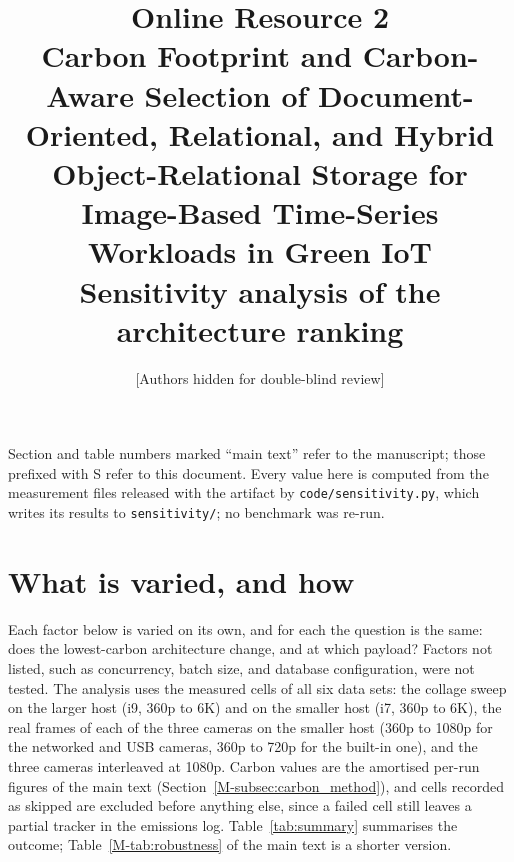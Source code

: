 \documentclass[11pt]{article}
\title{Online Resource 2\\[0.4em]
\large Carbon Footprint and Carbon-Aware Selection of Document-Oriented, Relational, and Hybrid Object-Relational Storage for Image-Based Time-Series Workloads in Green IoT\\[0.4em]
\normalsize Sensitivity analysis of the architecture ranking}
\author{[Authors hidden for double-blind review]}
\date{}
\begin{document}
\maketitle

\noindent Section and table numbers marked ``main text'' refer to the manuscript; those prefixed with S refer to this document. Every value here is computed from the measurement files released with the artifact by \texttt{code/sensitivity.py}, which writes its results to \texttt{sensitivity/}; no benchmark was re-run.

\section{What is varied, and how}\label{sec:method}
Each factor below is varied on its own, and for each the question is the same: does the lowest-carbon architecture change, and at which payload? Factors not listed, such as concurrency, batch size, and database configuration, were not tested. The analysis uses the measured cells of all six data sets: the collage sweep on the larger host (i9, 360p to 6K) and on the smaller host (i7, 360p to 6K), the real frames of each of the three cameras on the smaller host (360p to 1080p for the networked and USB cameras, 360p to 720p for the built-in one), and the three cameras interleaved at 1080p. Carbon values are the amortised per-run figures of the main text (Section~\ref{M-subsec:carbon_method}), and cells recorded as skipped are excluded before anything else, since a failed cell still leaves a partial tracker in the emissions log. Table~\ref{tab:summary} summarises the outcome; Table~\ref{M-tab:robustness} of the main text is a shorter version.
\end{document}
